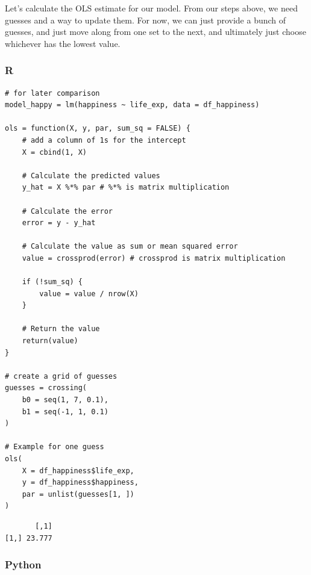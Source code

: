 \documentclass[
  letterpaper,
]{krantz}
\begin{document}
Let's calculate the OLS estimate for our model. From our steps above, we
need guesses and a way to update them. For now, we can just provide a
bunch of guesses, and just move along from one set to the next, and
ultimately just choose whichever has the lowest value.

\subsubsection{R}

\begin{verbatim}
# for later comparison
model_happy = lm(happiness ~ life_exp, data = df_happiness)

ols = function(X, y, par, sum_sq = FALSE) {
    # add a column of 1s for the intercept
    X = cbind(1, X)

    # Calculate the predicted values
    y_hat = X %*% par # %*% is matrix multiplication

    # Calculate the error
    error = y - y_hat

    # Calculate the value as sum or mean squared error
    value = crossprod(error) # crossprod is matrix multiplication

    if (!sum_sq) {
        value = value / nrow(X)
    }

    # Return the value
    return(value)
}

# create a grid of guesses
guesses = crossing(
    b0 = seq(1, 7, 0.1),
    b1 = seq(-1, 1, 0.1)
)

# Example for one guess
ols(
    X = df_happiness$life_exp,
    y = df_happiness$happiness,
    par = unlist(guesses[1, ])
)
\end{verbatim}

\begin{verbatim}
       [,1]
[1,] 23.777
\end{verbatim}

\subsubsection{Python}
\end{document}
